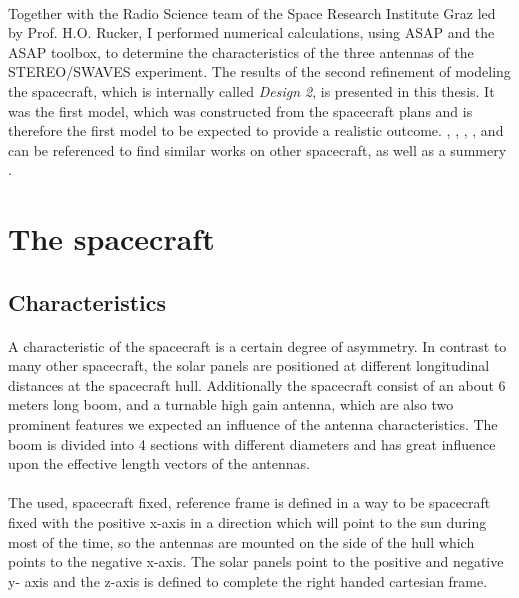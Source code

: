 \documentclass[a4paper,10pt]{thesis}
\begin{document}
\paragraph*{}
Together with the Radio Science team of the Space Research Institute Graz led by Prof. H.O. Rucker, I performed numerical calculations, using ASAP and the ASAP toolbox, to determine the characteristics of the three antennas of the STEREO/SWAVES experiment. The results of the second refinement of modeling the spacecraft, which is internally called \emph{Design 2}, is presented in this thesis. It was the first model, which was constructed from the spacecraft plans and is therefore the first model to be expected to provide a realistic outcome. \cite{vogl_01}, \cite{vogl_04}, \cite{cassini2}, \cite{cassini3}, \cite{cassini} \cite{marsis} and \\
\cite{marsis2} can be referenced to find similar works on other spacecraft, as well as a summery \cite{ruckerundi05}.

\section{\textbf{The spacecraft}}
\subsection{Characteristics}

\paragraph*{}
A characteristic of the spacecraft is a certain degree of
asymmetry. In contrast to many other spacecraft, the solar panels
are positioned at different longitudinal distances at the
spacecraft hull. Additionally the spacecraft consist of an about
6 meters long boom, and a turnable high gain antenna, which are also two
prominent features we expected an influence of the antenna
characteristics. The boom is divided into 4 sections with
different diameters and has great influence upon
the effective length vectors of the antennas.

\paragraph*{}
The used, spacecraft fixed, reference frame is defined in a way to be spacecraft fixed with the positive x-axis in a direction which will point to the sun during most of the time, so the antennas are mounted on the side of the hull which points to the negative x-axis. The solar panels point to the positive and negative y- axis and the z-axis is defined to complete the right handed cartesian frame.
\end{document}
